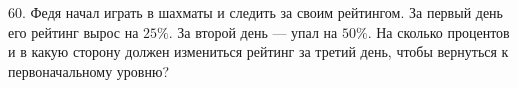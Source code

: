60. Федя начал играть в шахматы и следить за своим рейтингом. За первый день его рейтинг вырос на $25\%.$ За второй день --- упал на $50\%.$ На сколько процентов и в какую сторону должен измениться рейтинг за третий день, чтобы вернуться к первоначальному уровню?\\
